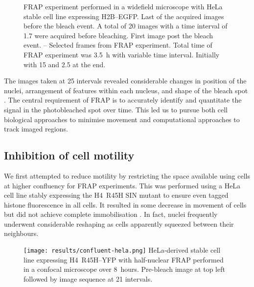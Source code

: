 \begin{figure}
        {
          FRAP experiment performed in a widefield microscope with
          HeLa stable cell line expressing H2B--EGFP.
          Last of the acquired images before the bleach event.  A
          total of 20 images with a time interval of \SI{1.7}{\sec}
          were acquired before bleaching.
          First image post the bleach event.
          --
          Selected frames from FRAP experiment.  Total time of FRAP
          experiment was \SI{3.5}{\hour} with variable time interval.
          Initially with \SI{15}{\sec} and \SI{2.5}{\min} at the end.
        }
      \label{fig:kill-frap:cell-movement}
    \end{figure}

    The images taken at \SI{25}{\min} intervals revealed considerable changes
    in position of the nuclei, arrangement of features within each nucleus,
    and shape of the bleach spot .
    The central requirement of FRAP is to accurately identify and
    quantitate the signal in the photobleached spot over time.
    This led us to pursue both cell biological approaches to minimise movement
    and computational approaches to track imaged regions.

  \subsection{Inhibition of cell motility}

    We first attempted to reduce motility by restricting the space available
    using cells at higher confluency for FRAP experiments.
    This was performed using a HeLa cell line stably expressing
    the H4~R45H SIN mutant to ensure even
    tagged histone fluorescence in all cells.
    It resulted in some decrease in movement of cells
    but did not achieve complete immobilisation
    .
    In fact, nuclei frequently underwent considerable reshaping as cells
    apparently squeezed between their neighbours.

    \begin{figure}
      \centering
      \texttt{[image: results/confluent-hela.png]}
        {
          HeLa-derived stable cell line expressing H4~R45H--YFP
          with half-nuclear FRAP performed in a confocal
          microscope over 8~hours.
          Pre-bleach image at top left followed by image
          sequence at \SI{21}{\min} intervals.
        }
      \label{fig:kill-frap:confluent-hela}
    \end{figure}

